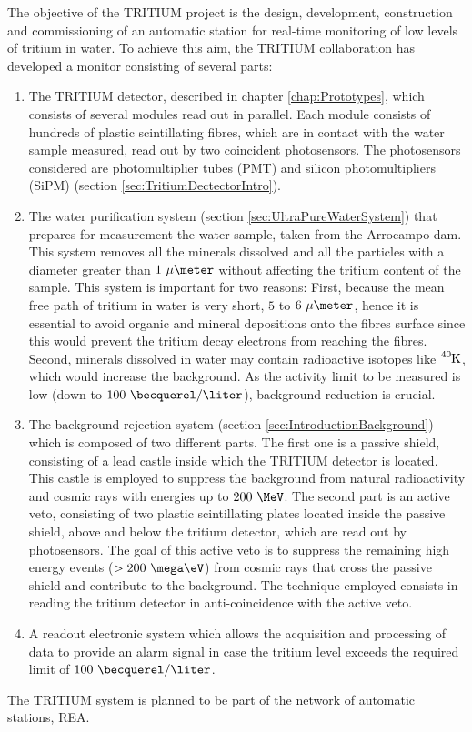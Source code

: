 The objective of the TRITIUM project is the design, development, construction and commissioning of an automatic station for real-time monitoring of low levels of tritium in water. To achieve this aim, the TRITIUM collaboration has developed a monitor consisting of several parts: 

\begin{enumerate}

\item{} The TRITIUM detector, described in chapter \ref{chap:Prototypes}, which consists of several modules read out in parallel. Each module consists of hundreds of plastic scintillating fibres, which are in contact with the water sample measured, read out by two coincident photosensors. The photosensors considered are photomultiplier tubes (PMT) and silicon photomultipliers (SiPM) (section \ref{sec:TritiumDectectorIntro}).

\item{} The water purification system (section \ref{sec:UltraPureWaterSystem}) that prepares for measurement the water sample, taken from the Arrocampo dam. This system removes all the minerals dissolved and all the particles with a diameter greater than $1~\mu\meter$ without affecting the tritium content of the sample. This system is important for two reasons: First, because the mean free path of tritium in water is very short, $5$ to $6~\mu\meter$,  hence it is essential to avoid organic and mineral depositions onto the fibres surface since this would prevent the tritium decay electrons from reaching the fibres. Second, minerals dissolved in water may contain radioactive isotopes like $\ce{^{40}K}$, which would increase the background. As the activity limit to be measured is low (down to $100~\becquerel/\liter$), background reduction is crucial.

\item{} The background rejection system (section \ref{sec:IntroductionBackground}) which is composed of two different parts. The first one is a passive shield, consisting of a lead castle inside which the TRITIUM detector is located. This castle is employed to suppress the background from natural radioactivity and cosmic rays with energies up to $200~\MeV$. The second part is an active veto, consisting of two plastic scintillating plates located inside the passive shield, above and below the tritium detector, which are read out by photosensors. The goal of this active veto is to suppress the remaining high energy events ($>200~\mega\eV$) from cosmic rays that cross the passive shield and contribute to the background. The technique employed consists in reading the tritium detector in anti-coincidence with the active veto.

\item{} A readout electronic system which allows the acquisition and processing of data to provide an alarm signal in case the tritium level exceeds the required limit of $100~\becquerel/\liter$.

\end{enumerate}

The TRITIUM system is planned to be part of the network of automatic stations, REA.